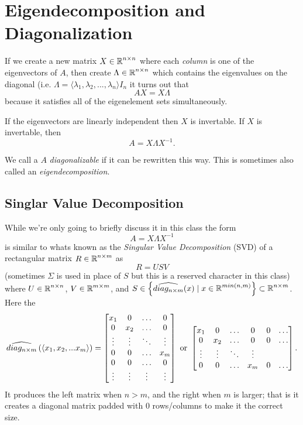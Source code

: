 \section{Eigendecomposition and Diagonalization}
If we create a new matrix $X\in\operatorname{\mathbb{R}}^{n\times n}$ where each \textit{column} is one of the eigenvectors of $A$, 
then create $\Lambda\in\operatorname{\mathbb{R}}^{n\times n}$ which contains the eigenvalues on the diagonal (i.e. $\Lambda = \langle\lambda_1,\lambda_2,...,\lambda_n\rangle I_n$ it turns out that 
\[ AX = X\Lambda \]
because it satisfies all of the eigenelement sets simultaneously. 

If the eigenvectors are linearly independent then $X$ is invertable. 
If $X$ is invertable, then 
\[ A = X\Lambda X^{-1}.\]

We call a $A$ \emph{diagonalizable} if it can be rewritten this way. 
This is sometimes also called an \emph{eigendecomposition}.

\subsection{Singlar Value Decomposition}
While we're only going to briefly discuss it in this class
the form \[ A = X\Lambda X^{-1}\]
is similar to whats known as the \emph{Singular Value Decomposition} (SVD)
of a rectangular matrix $R\in\operatorname{\mathbb{R}}^{n\times m}$
as 
\[R=USV\]
 (sometimes $\Sigma$ is used in place of $S$ but this is a reserved character in this class) 
 where $U\in\operatorname{\mathbb{R}}^{n\times n}$, $V\in\operatorname{\mathbb{R}}^{m\times m}$, 
 and $S\in\left\{\widehat{diag_{n\times m}}(x) \mid x\in\operatorname{\mathbb{R}}^{min(n,m)}\right\}\subset\operatorname{\mathbb{R}}^{n\times m}$.
 Here the \[\widehat{diag_{n\times m}}\left(\left\langle x_1,x_2,...x_m\right\rangle\right) = 
 \begin{bmatrix}x_1 & 0 & \hdots & 0\\0 & x_2 & \hdots & 0\\\vdots&\vdots&\ddots&\vdots\\0 & 0 & \hdots & x_m\\0 & 0 & \hdots &0\\\vdots&\vdots&\vdots&\vdots\\\end{bmatrix} \textnormal{ or }
 \begin{bmatrix}x_1 & 0 & \hdots & 0 & 0 & \hdots\\0 & x_2 & \hdots & 0 & 0 & \hdots\\\vdots&\vdots&\ddots&\vdots\\0 & 0 & \hdots & x_m & 0 & \hdots\\\end{bmatrix}
 .\] 
 It produces the left matrix when $n>m$, and the right when $m$ is larger; 
 that is it creates a diagonal matrix padded with 0 rows/columns to make it the correct size.
 
